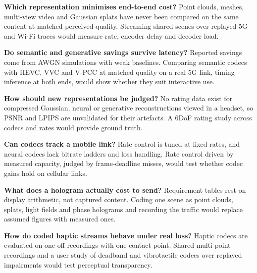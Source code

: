 \begin{openproblems}
\item \textbf{Which representation minimises end-to-end cost?} Point clouds, meshes,
  multi-view video and Gaussian splats have never been compared on the same content at matched perceived
  quality. Streaming shared scenes over replayed 5G and Wi-Fi traces would measure rate, encoder
  delay and decoder load.
\item \textbf{Do semantic and generative savings survive latency?} Reported savings come from AWGN
  simulations with weak baselines. Comparing semantic codecs with HEVC, VVC and V-PCC at matched quality
  on a real 5G link, timing inference at both ends, would show whether they suit interactive use.
\item \textbf{How should new representations be judged?} No rating data exist for compressed Gaussian,
  neural or generative reconstructions viewed in a headset, so PSNR and LPIPS are unvalidated for their
  artefacts. A 6DoF rating study across codecs and rates would provide ground truth.
\item \textbf{Can codecs track a mobile link?} Rate control is tuned at fixed rates, and neural codecs lack
  bitrate ladders and loss handling. Rate control driven by measured capacity, judged by frame-deadline
  misses, would test whether codec gains hold on cellular links.
\item \textbf{What does a hologram actually cost to send?} Requirement tables rest on display arithmetic,
  not captured content. Coding one scene as point clouds, splats, light fields and phase holograms and
  recording the traffic would replace assumed figures with measured ones.
\item \textbf{How do coded haptic streams behave under real loss?} Haptic codecs are evaluated on one-off
  recordings with one contact point. Shared multi-point recordings and a user study of deadband and
  vibrotactile codecs over replayed impairments would test perceptual transparency.
\end{openproblems}
